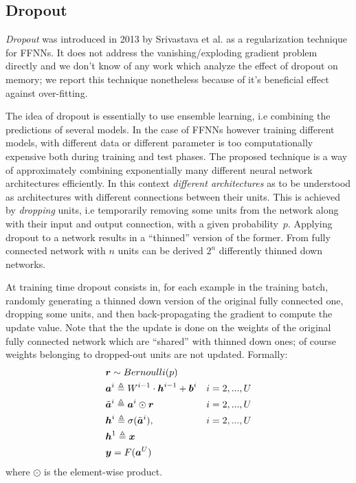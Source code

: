 \subsection{Dropout} 

\textit{Dropout} was introduced in 2013 by Srivastava et al. \cite{dropout} as a regularization technique for FFNNs. It does not address the vanishing/exploding gradient problem directly and we don't know of any work which analyze the effect of dropout on memory; we report this technique nonetheless because of it's beneficial effect against over-fitting.

The idea of dropout is essentially to use ensemble learning, i.e combining the predictions of several models. In the case of FFNNs however training different models, with different data or different parameter is too computationally expensive both during training and test phases.
The proposed technique is a way of approximately combining exponentially many different neural network architectures efficiently. In this context \textit{different architectures} as to be understood as architectures with different connections between their units. This is achieved by \textit{dropping} units, i.e temporarily removing some units from the network along with their input and output connection, with a given probability~$p$. Applying dropout to a network results in a ``thinned'' version of the former. From fully connected network with $n$ units can be derived $2^n$ differently thinned down networks.

At training time dropout consists in, for each example in the training batch, randomly generating a thinned down version of the original fully connected one, dropping some units, and then back-propagating the gradient to compute the update value. Note that the the update is done on the weights of the original fully connected network which are ``shared'' with thinned down ones; of course weights belonging to dropped-out units are not updated. Formally:
\begin{align}
&\boldsymbol{r} \sim Bernoulli(p)&\\
&\boldsymbol{a}^{i} \triangleq W^{i-1} \cdot \boldsymbol{h}^{i-1} +\boldsymbol{b}^i  & i=2,...,U\\
&\tilde{\boldsymbol{a}}^{i} \triangleq \boldsymbol{a}^i \odot \boldsymbol{r} & i=2,...,U\\
&\boldsymbol{h}^{i} \triangleq \sigma(\tilde{\boldsymbol{a}}^{i}), & i=2,...,U\\
&\boldsymbol{h}^{1} \triangleq \boldsymbol{x} &\\
&\boldsymbol{y}=F(\boldsymbol{a}^{U}) &
\end{align}
where $\odot$ is the element-wise product.

